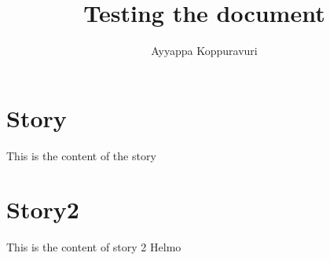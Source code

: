 \documentclass{article}
\title{Testing the document}
\author{Ayyappa Koppuravuri}
\begin{document}
\maketitle
\tableofcontents
\section{Story}
This is the content of the story
\section{Story2}
This is the content of story 2
Helmo
\end{document}
